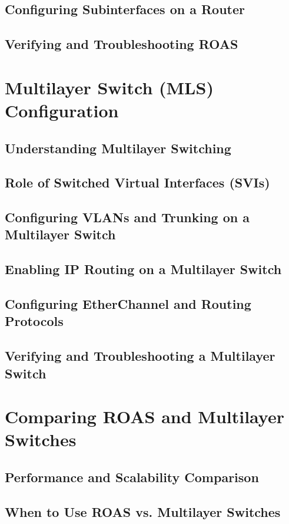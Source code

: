 \documentclass[a4paper]{report}
\begin{document}
\section{Configuring Subinterfaces on a Router}
\section{Verifying and Troubleshooting ROAS}

\chapter{Multilayer Switch (MLS) Configuration}
\section{Understanding Multilayer Switching}
\section{Role of Switched Virtual Interfaces (SVIs)}
\section{Configuring VLANs and Trunking on a Multilayer Switch}
\section{Enabling IP Routing on a Multilayer Switch}
\section{Configuring EtherChannel and Routing Protocols}
\section{Verifying and Troubleshooting a Multilayer Switch}

\chapter{Comparing ROAS and Multilayer Switches}
\section{Performance and Scalability Comparison}
\section{When to Use ROAS vs. Multilayer Switches}
\end{document}
